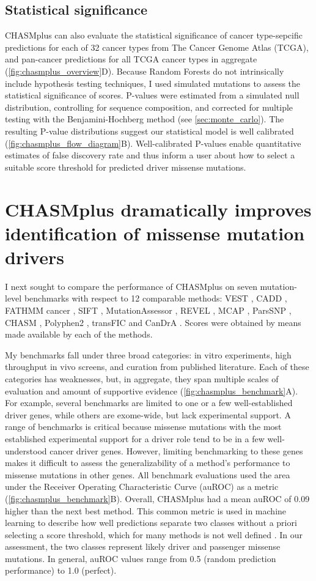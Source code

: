 \subsection{Statistical significance}
CHASMplus can also evaluate the statistical significance of cancer type-sepcific predictions for each of 32 cancer types from The Cancer Genome Atlas (TCGA), and pan-cancer predictions for all TCGA cancer types in aggregate (\autoref{fig:chasmplus_overview}D). Because Random Forests do not intrinsically include hypothesis testing techniques, I used simulated mutations to assess the statistical significance of scores. P-values were estimated from a simulated null distribution, controlling for sequence composition, and corrected for multiple testing with the Benjamini-Hochberg method (see \autoref{sec:monte_carlo}). The resulting P-value distributions suggest our statistical model is well calibrated (\autoref{fig:chasmplus_flow_diagram}B).  Well-calibrated P-values enable quantitative estimates of false discovery rate and thus inform a user about how to select a suitable score threshold for predicted driver missense mutations.

\section{CHASMplus dramatically improves identification of  missense mutation drivers}
I next sought to compare the performance of CHASMplus on seven mutation-level benchmarks with respect to 12 comparable methods: VEST \cite{RN30}, CADD \cite{RN34}, FATHMM cancer \cite{RN39}, SIFT \cite{RN116}, MutationAssessor \cite{RN38}, REVEL \cite{RN32}, MCAP \cite{RN33}, ParsSNP \cite{RN35}, CHASM \cite{RN29}, Polyphen2 \cite{RN28}, transFIC \cite{RN31} and CanDrA \cite{RN36}. Scores were obtained by means made available by each of the methods. 

My benchmarks fall under three broad categories: in vitro experiments, high throughput in vivo screens, and curation from published literature.  Each of these categories has weaknesses, but, in aggregate, they span multiple scales of evaluation and amount of supportive evidence (\autoref{fig:chasmplus_benchmark}A). For example, several benchmarks are limited to one or a few well-established driver genes, while others are exome-wide, but lack experimental support. A range of benchmarks is critical because missense mutations with the most established experimental support for a driver role tend to be in a few well-understood cancer driver genes.  However, limiting benchmarking to these genes makes it difficult to assess the generalizability of a method's performance to missense mutations in other genes. All benchmark evaluations used the area under the Receiver Operating Characteristic Curve (auROC) as a metric (\autoref{fig:chasmplus_benchmark}B).  Overall, CHASMplus had a mean auROC of 0.09 higher than the next best method. This common metric is used in machine learning to describe how well predictions separate two classes without a priori selecting a score threshold, which for many methods is not well defined \cite{RN140}. In our assessment, the two classes represent likely driver and passenger missense mutations. In general, auROC values range from 0.5 (random prediction performance) to 1.0 (perfect).

